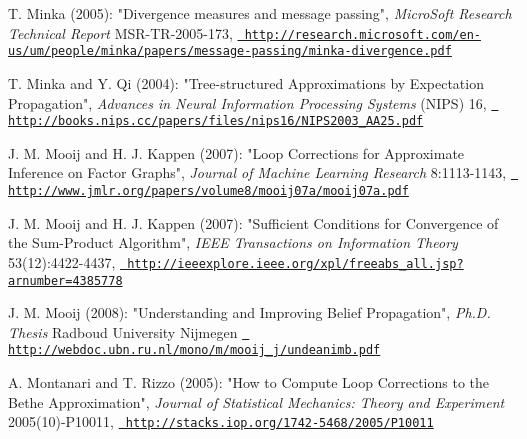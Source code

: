 \label{bibliography_Min05}%
%
 T. Minka (2005)\+: "{}\+Divergence measures and message passing"{}, {\itshape Micro\+Soft Research Technical Report} MSR-\/\+TR-\/2005-\/173, \href{http://research.microsoft.com/en-us/um/people/minka/papers/message-passing/minka-divergence.pdf}{\texttt{ http\+://research.\+microsoft.\+com/en-\/us/um/people/minka/papers/message-\/passing/minka-\/divergence.\+pdf}}

\label{bibliography_MiQ04}%
%
 T. Minka and Y. Qi (2004)\+: "{}\+Tree-\/structured Approximations by Expectation Propagation"{}, {\itshape Advances in Neural Information Processing Systems} (NIPS) 16, \href{http://books.nips.cc/papers/files/nips16/NIPS2003_AA25.pdf}{\texttt{ http\+://books.\+nips.\+cc/papers/files/nips16/\+NIPS2003\+\_\+\+AA25.\+pdf}}

\label{bibliography_MoK07}%
%
 J. M. Mooij and H. J. Kappen (2007)\+: "{}\+Loop Corrections for Approximate Inference on Factor Graphs"{}, {\itshape Journal of Machine Learning Research} 8\+:1113-\/1143, \href{http://www.jmlr.org/papers/volume8/mooij07a/mooij07a.pdf}{\texttt{ http\+://www.\+jmlr.\+org/papers/volume8/mooij07a/mooij07a.\+pdf}}

\label{bibliography_MoK07b}%
%
 J. M. Mooij and H. J. Kappen (2007)\+: "{}\+Sufficient Conditions for Convergence of the Sum-\/\+Product Algorithm"{}, {\itshape IEEE Transactions on Information Theory} 53(12)\+:4422-\/4437, \href{http://ieeexplore.ieee.org/xpl/freeabs_all.jsp?arnumber=4385778}{\texttt{ http\+://ieeexplore.\+ieee.\+org/xpl/freeabs\+\_\+all.\+jsp?arnumber=4385778}}

\label{bibliography_Moo08}%
%
 J. M. Mooij (2008)\+: "{}\+Understanding and Improving Belief Propagation"{}, {\itshape Ph.\+D. Thesis} Radboud University Nijmegen \href{http://webdoc.ubn.ru.nl/mono/m/mooij_j/undeanimb.pdf}{\texttt{ http\+://webdoc.\+ubn.\+ru.\+nl/mono/m/mooij\+\_\+j/undeanimb.\+pdf}}

\label{bibliography_MoR05}%
%
 A. Montanari and T. Rizzo (2005)\+: "{}\+How to Compute Loop Corrections to the Bethe Approximation"{}, {\itshape Journal of Statistical Mechanics\+: Theory and Experiment} 2005(10)-\/P10011, \href{http://stacks.iop.org/1742-5468/2005/P10011}{\texttt{ http\+://stacks.\+iop.\+org/1742-\/5468/2005/\+P10011}}


